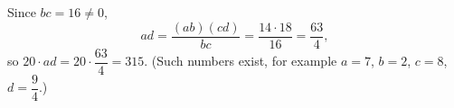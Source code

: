 Since $bc=16\ne0$,
\[ad=\dfrac{(ab)(cd)}{bc}=\dfrac{14\cdot18}{16}=\dfrac{63}{4},\]
so $20\cdot ad=20\cdot\dfrac{63}{4}=\boxed{315}$. (Such numbers exist, for example $a=7$, $b=2$, $c=8$, $d=\dfrac94$.)
